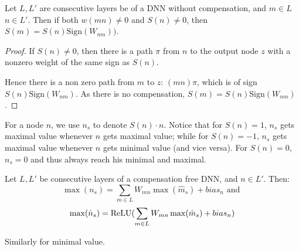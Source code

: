 	
	\begin{lemma}[Sign]
		\label{lemma1}
		Let $L,L'$  are consecutive layers be of a DNN without compensation, and $m\in L$ $n\in L'$. 
		Then if both 
		$w(m n) \neq 0$ and $S(n) \neq 0$, then 
		$S(m)=S(n)\mathrm{Sign}(W_{n m}))$.
	\end{lemma}
	
	\begin{proof}
		If $S(n) \neq 0$, then there is a path $\pi$ from $n$ to the output node $z$ with a nonzero weight of the same sign as $S(n)$. 
		
		Hence there is a non zero path from $m$ to $z$: $(m n) \pi$, which is of sign 
		$S(n)\mathrm{Sign}(W_{n m})$. As there is no compensation, $S(m)=S(n)\mathrm{Sign}(W_{n m})$.
	\end{proof}
	
	
	For a node $n$, we use $n_s$ to denote $S(n)\cdot n$. 
	Notice that for $S(n)=1$, $n_s$ gets maximal value whenever $n$ gets maximal value; 
	while for $S(n)=-1$, $n_s$ gets maximal value whenever $n$ gets minimal value (and vice versa). For $S(n)=0$, $n_s=0$ and thus always reach his minimal and maximal.
	
	
	
	\begin{lemma}
		\label{lemma2}
		Let $L,L'$ be consecutive layers of a compensation free DNN, and $n \in L'$. 
		Then:
		$$ \max(n_s)=\sum_{m \in L}W_{m n} \max(\hat{m}_s)+bias_n \text{ and }$$
		$$\max(\hat{n}_s)=\mathrm{ReLU}(\sum_{m \in L}W_{m n} \max(\hat{m}_s)+bias_n)$$
		
		
		
		Similarly for minimal value.
		
		\end{lemma}
		
